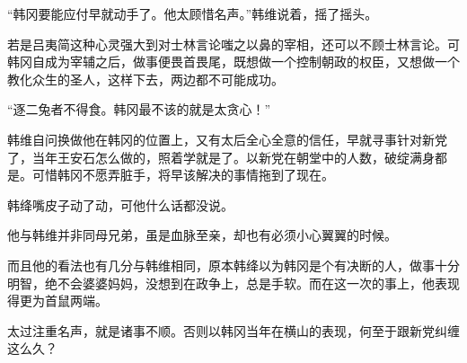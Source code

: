 “韩冈要能应付早就动手了。他太顾惜名声。”韩维说着，摇了摇头。

若是吕夷简这种心灵强大到对士林言论嗤之以鼻的宰相，还可以不顾士林言论。可韩冈自成为宰辅之后，做事便畏首畏尾，既想做一个控制朝政的权臣，又想做一个教化众生的圣人，这样下去，两边都不可能成功。

“逐二兔者不得食。韩冈最不该的就是太贪心！”

韩维自问换做他在韩冈的位置上，又有太后全心全意的信任，早就寻事针对新党了，当年王安石怎么做的，照着学就是了。以新党在朝堂中的人数，破绽满身都是。可惜韩冈不愿弄脏手，将早该解决的事情拖到了现在。

韩绛嘴皮子动了动，可他什么话都没说。

他与韩维并非同母兄弟，虽是血脉至亲，却也有必须小心翼翼的时候。

而且他的看法也有几分与韩维相同，原本韩绛以为韩冈是个有决断的人，做事十分明智，绝不会婆婆妈妈，没想到在政争上，总是手软。而在这一次的事上，他表现得更为首鼠两端。

太过注重名声，就是诸事不顺。否则以韩冈当年在横山的表现，何至于跟新党纠缠这么久？
